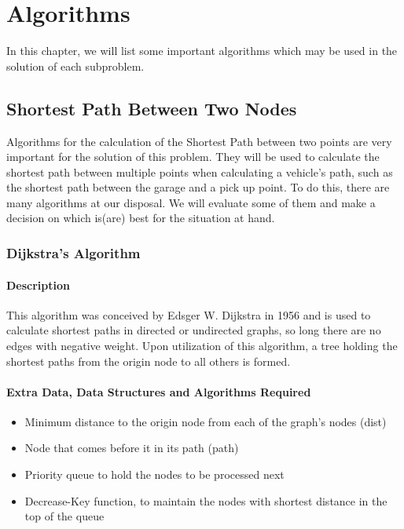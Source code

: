 \chapter{Algorithms}
In this chapter, we will list some important algorithms which may be used in the solution of each subproblem.

\section{Shortest Path Between Two Nodes}

Algorithms for the calculation of the Shortest Path between two points are very important for the solution of this problem. They will be used to calculate the shortest path between multiple points when calculating a vehicle's path, such as the shortest path between the garage and a pick up point. To do this, there are many algorithms at our disposal. We will evaluate some of them and make a decision on which is(are) best for the situation at hand.


\subsection{Dijkstra's Algorithm}

\subsubsection{Description}
This algorithm was conceived by Edsger W. Dijkstra in 1956 and is used to calculate shortest paths in directed or undirected graphs, so long there are no edges with negative weight. Upon utilization of this algorithm, a tree holding the shortest paths from the origin node to all others is formed. 

\subsubsection{Extra Data, Data Structures and Algorithms Required}
\begin{itemize}
    \item Minimum distance to the origin node from each of the graph's nodes (dist)
    \item Node that comes before it in its path (path)
    \item Priority queue to hold the nodes to be processed next
    \item Decrease-Key function, to maintain the nodes with shortest distance in the top of the queue
\end{itemize}

